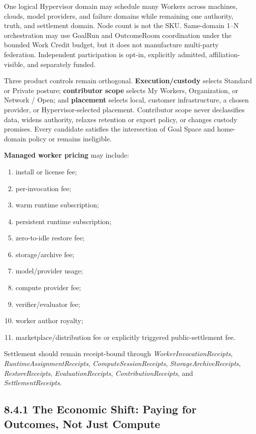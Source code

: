 \documentclass[
  11pt,
]{article}
\providecommand{\tightlist}{%
  \setlength{\itemsep}{0pt}\setlength{\parskip}{0pt}}
\begin{document}
One logical Hypervisor domain may schedule many Workers across machines,
clouds, model providers, and failure domains while remaining one
authority, truth, and settlement domain. Node count is not the SKU.
Same-domain 1--N orchestration may use GoalRun and OutcomeRoom
coordination under the bounded Work Credit budget, but it does not
manufacture multi-party federation. Independent participation is opt-in,
explicitly admitted, affiliation-visible, and separately funded.

Three product controls remain orthogonal. \textbf{Execution/custody}
selects Standard or Private posture; \textbf{contributor scope} selects
My Workers, Organization, or Network / Open; and \textbf{placement}
selects local, customer infrastructure, a chosen provider, or
Hypervisor-selected placement. Contributor scope never declassifies data,
widens authority, relaxes retention or export policy, or changes custody
promises. Every candidate satisfies the intersection of Goal Space and
home-domain policy or remains ineligible.

\textbf{Managed worker pricing} may include:

\begin{enumerate}
\def\labelenumi{\arabic{enumi}.}
\tightlist
\item
  install or license fee;
\item
  per-invocation fee;
\item
  warm runtime subscription;
\item
  persistent runtime subscription;
\item
  zero-to-idle restore fee;
\item
  storage/archive fee;
\item
  model/provider usage;
\item
  compute provider fee;
\item
  verifier/evaluator fee;
\item
  worker author royalty;
\item
  marketplace/distribution fee or explicitly triggered public-settlement
  fee.
\end{enumerate}

Settlement should remain receipt-bound through
\emph{WorkerInvocationReceipts}, \emph{RuntimeAssignmentReceipts},
\emph{ComputeSessionReceipts}, \emph{StorageArchiveReceipts},
\emph{RestoreReceipts}, \emph{EvaluationReceipts},
\emph{ContributionReceipts}, and \emph{SettlementReceipts}.

\hypertarget{the-economic-shift-paying-for-outcomes-not-just-compute}{%
\subsection{8.4.1 The Economic Shift: Paying for Outcomes, Not Just
Compute}\label{the-economic-shift-paying-for-outcomes-not-just-compute}}
\end{document}
